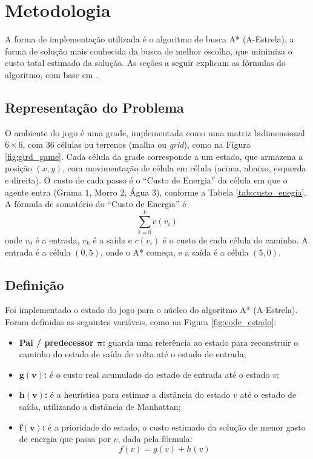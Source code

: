 \chapter{Metodologia}
\label{chap:metodo}

A forma de implementação utilizada é o algoritmo de busca A* (A-Estrela), a forma de solução mais conhecida da busca de melhor escolha, que minimiza o custo total estimado da solução.
As seções a seguir explicam as fórmulas do algoritmo, com base em .

\section{Representação do Problema}
O ambiente do jogo é uma grade, implementada como uma matriz bidimensional $6\times 6$, com $36$ células ou terrenos (malha ou \textit{grid}), como na Figura \ref{fig:gird_game}.
Cada célula da grade corresponde a um estado, que armazena a posição $(x, y)$, com movimentação de célula em célula (acima, abaixo, esquerda e direita).
O custo de cada passo é o ``Custo de Energia'' da célula em que o agente entra (Grama $1$, Morro $2$, Água $3$), conforme a Tabela \ref{tab:custo_enegia}. A fórmula de somatório do ``Custo de Energia'' é
\begin{equation}\sum_{i = 0}^{k}  c(v_i) \end{equation} onde $v_0$ é a entrada, $v_k$ é a saída e $c(v_i)$ é o custo de cada célula do caminho.
A entrada é a célula $(0,5)$, onde o A* começa, e a saída é a célula $(5,0)$.



\section{Definição}
Foi implementado o estado do jogo para o núcleo do algoritmo A* (A-Estrela). Foram definidas as seguintes variáveis, como na Figura \ref{fig:code_estado}:

\begin{itemize}
    \item \textbf{Pai / predecessor $\boldsymbol{\pi}$:} guarda uma referência ao estado para reconstruir o caminho do estado de saída de volta até o estado de entrada;
    \item \textbf{$\boldsymbol{g(v)}$:} é o custo real acumulado do estado de entrada até o estado $v$;
    \item \textbf{$\boldsymbol{h(v)}$:} é a heurística para estimar a distância do estado $v$ até o estado de saída, utilizando a distância de Manhattan;
    \item \textbf{$\boldsymbol{f(v)}$:} é a prioridade do estado, o custo estimado da solução de menor gasto de energia que passa por $v$, dada pela fórmula:
          \begin{equation} f(v) = g(v) + h(v) \end{equation}
\end{itemize}

